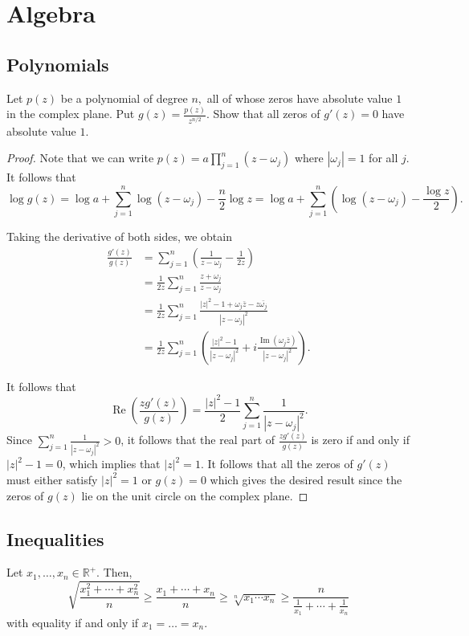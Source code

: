 \documentclass[11pt]{article}
\newcommand{\R}{\mathbb{R}}
\renewcommand{\>}{\rangle}
\newcommand{\<}{\langle}
\begin{document}
\pagebreak
\section{Algebra}
\subsection{Polynomials}
\begin{problem}[Putnam 2005/A3] Let $p(z)$ be a polynomial of degree $n,$ all of whose zeros have absolute value $1$ in the complex plane. Put $g(z)=\frac{p(z)}{z^{n/2}}.$ Show that all zeros of $g'(z)=0$ have absolute value $1.$
\end{problem}
\begin{proof}
Note that we can write $p(z) = a \prod_{j=1}^n (z - \omega_j)$ where $|\omega_j| = 1$ for all $j$. It follows that 
$$\log g(z) = \log a + \sum_{j=1}^n \log (z - \omega_j) - \frac{n}{2} \log z = \log a + \sum_{j=1}^n \left (\log (z - \omega_j) - \frac{\log z}{2} \right).$$

Taking the derivative of both sides, we obtain
\begin{align*}
\frac{g'(z)}{g(z)} &= \sum_{j=1}^n \left (\frac{1}{z - \omega_j} - \frac{1}{2z} \right) \\
&= \frac{1}{2z} \sum_{j=1}^n \frac{z + \omega_j}{z - \omega_j} \\
&= \frac{1}{2z} \sum_{j=1}^n \frac{|z|^2 - 1 + \omega_j \bar{z} - z \bar{\omega_j}}{|z - \omega_j|^2} \\
&= \frac{1}{2z} \sum_{j=1}^n \left ( \frac{|z|^2 - 1}{|z - \omega_j|^2} + i\frac{\operatorname{Im}(\omega_j \bar{z})}{|z - \omega_j|^2} \right).
\end{align*}

It follows that 
$$\operatorname{Re}\left (\frac{zg'(z)}{g(z)} \right) = \frac{|z|^2 - 1}{2} \sum_{j=1}^n \frac{1}{|z - \omega_j|^2}.$$
Since $\sum_{j=1}^n \frac{1}{|z - \omega_j|^2} > 0$, it follows that the real part of $\frac{zg'(z)}{g(z)}$ is zero if and only if $|z|^2 - 1 = 0$, which implies that $|z|^2 = 1$.  It follows that all the zeros of $g'(z)$ must either satisfy $|z|^2 = 1$ or $g(z) = 0$ which gives the desired result since the zeros of $g(z)$ lie on the unit circle on the complex plane.  
\end{proof}
\subsection{Inequalities}
\begin{theorem}[QM-AM-GM-HM]
Let $x_1, \dots, x_n \in \R^+$.  Then,
\[\sqrt{\frac{x_1^2+\cdots+x_n^2}{n}} \ge\frac{x_1+\cdots+x_n}{n}\ge\sqrt[n]{x_1\cdots x_n}\ge\frac{n}{\frac{1}{x_1}+\cdots+\frac{1}{x_n}}\]
with equality if and only if $x_1 = \dots = x_n$.
\end{theorem}
\end{document}
